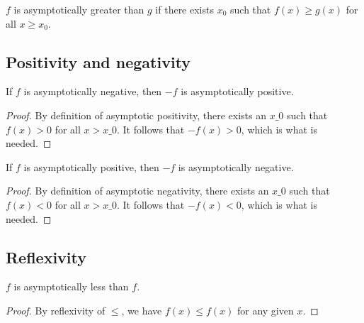 \begin{definition}
    \label{def:asymp_ge}
    \leanok
    $f$ is asymptotically greater than $g$ if there exists $x_0$ such that
    $f(x) \ge g(x)$ for all $x \ge x_0$.

\end{definition}


\subsection{Positivity and negativity}

\begin{lemma}
    \label{lemma:asymp_neg_of_pos}
    \leanok
    If $f$ is asymptotically negative, then $-f$ is asymptotically positive.
\end{lemma}

\begin{proof}
    \leanok
    By definition of asymptotic positivity, there exists an $x\_0$ such that $f(x) > 0$
    for all $x > x\_0$. It follows that $-f(x) > 0$, which is what is needed.
\end{proof}

\begin{lemma}
    \label{lemma:asymp_pos_of_neg}
    \leanok
    If $f$ is asymptotically positive, then $-f$ is asymptotically negative.
\end{lemma}

\begin{proof}
    \leanok
    By definition of asymptotic negativity, there exists an $x\_0$ such that $f(x) < 0$
    for all $x > x\_0$. It follows that $-f(x) < 0$, which is what is needed.
\end{proof}


\subsection{Reflexivity}

\begin{lemma}
    \label{lemma:asymp_le_refl}
    \leanok
    $f$ is asymptotically less than $f$.
\end{lemma}

\begin{proof}
    \leanok
    By reflexivity of $\le$, we have $f(x) \le f(x)$ for any given $x$.
\end{proof}

